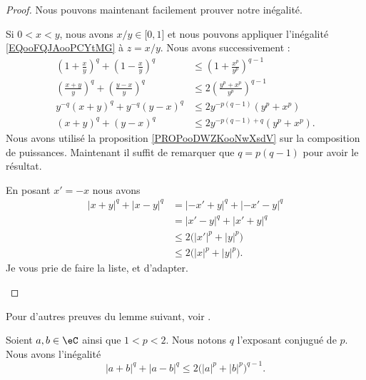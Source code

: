 \begin{proof}
	Nous pouvons maintenant facilement prouver notre inégalité.
	\begin{subproof}
		\spitem[Pour \( 0<x<y\)]
		Si \( 0<x<y\), nous avons \( x/y\in \mathopen[ 0 , 1 \mathclose]\) et nous pouvons appliquer l'inégalité \eqref{EQooFQJAooPCYtMG} à \( z=x/y\). Nous avons successivement :
		\begin{subequations}
			\begin{align}
				\left(1+\frac{ x }{ y }\right)^q+\left( 1-\frac{ x }{ y } \right)^q   & \leq \left( 1+\frac{ x^p }{ y^p } \right)^{q-1}    \\
				\left( \frac{ x+y }{ y } \right)^q+\left( \frac{ y-x }{ y } \right)^q & \leq 2\left( \frac{ y^p+x^p }{ y^p } \right)^{q-1} \\
				y^{-q}(x+y)^q+y^{-q}(y-x)^q                                           & \leq 2y^{-p(q-1)}(y^p+x^p)                         \\
				(x+y)^q+(y-x)^q                                                       & \leq 2y^{-p(q-1)+q}(y^p+x^p).
			\end{align}
		\end{subequations}
		Nous avons utilisé la proposition \ref{PROPooDWZKooNwXsdV} sur la composition de puissances. Maintenant il suffit de remarquer que \( q=p(q-1)\) pour avoir le résultat.

		\spitem[\( x<0\) et \( y>0\)]
		En posant \( x'=-x\) nous avons
		\begin{subequations}
			\begin{align}
				| x+y |^q+| x-y |^q & =| -x'+y |^q+| -x'-y |^q           \\
				                    & =| x'-y |^q+| x'+y |^q             \\
				                    & \leq 2\big( | x' |^p+| y |^p \big) \\
				                    & \leq 2\big( | x |^p+| y |^p \big).
			\end{align}
		\end{subequations}
		Je vous prie de faire la liste, et d'adapter.
	\end{subproof}
\end{proof}


Pour d'autres preuves du lemme suivant, voir \cite{BIBooHJQOooJsInho}.
\begin{lemma}       \label{LEMooLTROooVusGte}
	Soient \( a,b\in \eC\) ainsi que \( 1<p<2\). Nous notons \( q\) l'exposant conjugué de \( p\). Nous avons l'inégalité
	\begin{equation}
		| a+b |^q+| a-b |^q\leq 2\big( | a |^p+| b |^p \big)^{q-1}.
	\end{equation}
\end{lemma}

